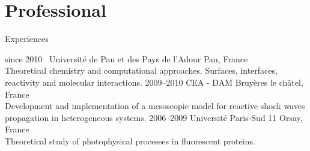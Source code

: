 \documentclass{cv-style}     %
\begin{document}





\vspace{-2mm}
\section{Professional }{Experiences}
\vspace{-0.3cm}

\begin{entrylist}
\entry
  {since 2010~}
  {Université de Pau et des Pays de l'Adour}
  {Pau, France}
  {\\
   Theoretical chemistry and computational approaches.
   Surfaces, interfaces, reactivity and molecular interactions.}
\entry
  {2009--2010}
  {CEA - DAM}
  {Bruyères le châtel, France}
  {
  \\
  Development and implementation of a mesoscopic model for reactive shock waves
  propagation in heterogeneous systems.
  }
\entry
  {2006--2009}
  {Université Paris-Sud 11}
  {Orsay, France}
  {
  \\
  Theoretical study of photophysical processes in fluorescent proteins.
  }
\end{entrylist}
\end{document}
